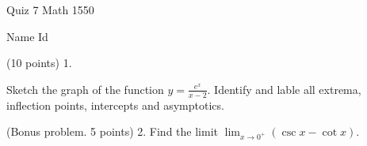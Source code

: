 \documentclass{article}
\begin{document}
\begin{large}
\begin{bf}
\hspace{1.5in}
\parbox{1in}{Quiz 7 \newline Math 1550}
\hspace{1in}
\parbox{1in}{ Name \newline Id}
\end{bf}
\end{large}

 \vspace{0.3in}

(10 points) 1. \parbox[t]{4in}{Sketch the graph of the function 
$\displaystyle{y=\frac{e^x}{x-2}}$. Identify and lable all
extrema, inflection points, intercepts and asymptotics.
}

\vspace{6.50in}  
(Bonus problem. 5 points) 2. Find the limit \quad $\displaystyle{
\lim_{x\to 0^+}(\csc x-\cot x)}$.
\end{document}
